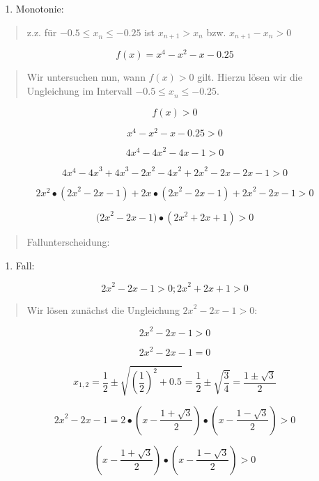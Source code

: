 \documentclass[a4paper, 12pt]{book}
\begin{document}
\begin{enumerate}
\def\labelenumi{\arabic{enumi})}
\item
  Monotonie:
\end{enumerate}

\begin{quote}
z.z. für \(- 0.5{\leq x}_{n} \leq  - 0.25\) ist
\(x_{n + 1} > x_{n}\) bzw. \(x_{n + 1} - {x}_{n} > 0\)
\end{quote}

\[f(x) = x^{4} - x^{2} - x - 0.25\]

\begin{quote}
Wir untersuchen nun, wann \(f(x) > 0\) gilt. Hierzu lösen wir die
Ungleichung im Intervall \(- 0.5{\leq x}_{n} \leq  - 0.25\).
\end{quote}

\[f(x) > 0\]

\[x^{4} - x^{2} - x - 0.25 > 0\]

\[4x^{4} - {4x}^{2} - 4x - 1 > 0\]

\[4x^{4} - {4x}^{3} + {4x}^{3} - {2x}^{2} - {4x}^{2} + {2x}^{2} - 2x - 2x - 1 > 0\]

\[2x^{2} \bullet ({2x}^{2} - 2x - 1) + 2x \bullet ({2x}^{2} - 2x - 1) + {2x}^{2} - 2x - 1 > 0\]

\[{(2x}^{2} - 2x - 1) \bullet ({2x}^{2} + 2x + 1) > 0\]

\begin{quote}
Fallunterscheidung:
\end{quote}

\begin{enumerate}
\def\labelenumi{\arabic{enumi}.}
\item
  Fall:
\end{enumerate}

\[{2x}^{2} - 2x - 1 > 0;{2x}^{2} + 2x + 1 > 0\]

\begin{quote}
Wir lösen zunächst die Ungleichung \({2x}^{2} - 2x - 1 > 0\):
\end{quote}

\[{2x}^{2} - 2x - 1 > 0\]

\[{2x}^{2} - 2x - 1 = 0\]

\[x_{1,2} = \frac{1}{2} \pm \sqrt{\left( \frac{1}{2} \right)^{2} + 0.5} = \frac{1}{2} \pm \sqrt{\frac{3}{4}} = \frac{1 \pm \sqrt{3}}{2}\]

\[{2x}^{2} - 2x - 1 = 2 \bullet (x - \frac{1 + \sqrt{3}}{2}) \bullet (x - \frac{1 - \sqrt{3}}{2}) > 0\]

\[(x - \frac{1 + \sqrt{3}}{2}) \bullet (x - \frac{1 - \sqrt{3}}{2}) > 0\]
\end{document}
